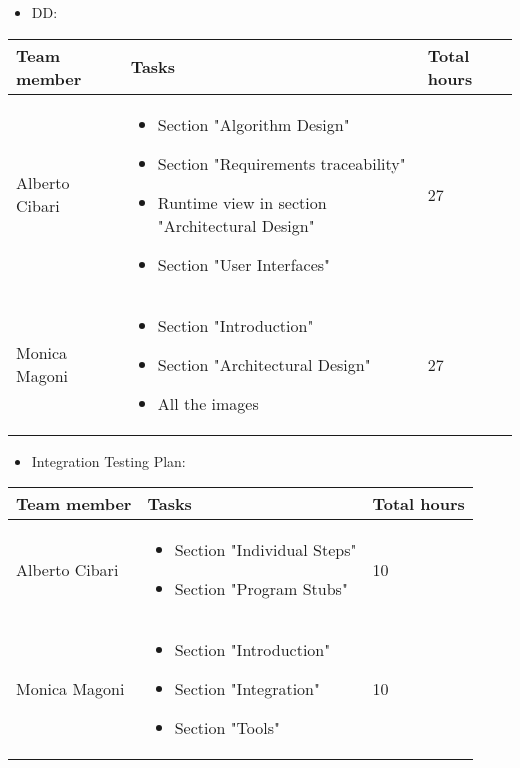 \newpage
\begin{itemize}
    \item DD:
\end{itemize}
\begin{table}[H]
    \centering
    \begin{tabular}{|l|p{8cm}|l|}
        \hline
        \textbf{Team member} & \textbf{Tasks} & \textbf{Total hours}\\
        \hline
        Alberto Cibari & \begin{itemize}
            \item Section "Algorithm Design"
            \item Section "Requirements traceability"
            \item Runtime view in section "Architectural Design"
            \item Section "User Interfaces"
        \end{itemize} & 27\\
        \hline
        Monica Magoni & \begin{itemize}
            \item Section "Introduction"
            \item Section "Architectural Design"
            \item All the images
        \end{itemize} & 27\\
        \hline
    \end{tabular}
\end{table}


\begin{itemize}
    \item Integration Testing Plan:
\end{itemize}
\begin{table}[H]
    \centering
    \begin{tabular}{|l|p{8cm}|l|}
        \hline
        \textbf{Team member} & \textbf{Tasks} & \textbf{Total hours}\\
        \hline
        Alberto Cibari & \begin{itemize}
            \item Section "Individual Steps"
            \item Section "Program Stubs"
        \end{itemize} & 10\\
        \hline
        Monica Magoni & \begin{itemize}
            \item Section "Introduction"
            \item Section "Integration"
            \item Section "Tools"
        \end{itemize} & 10\\
        \hline
    \end{tabular}
\end{table}


